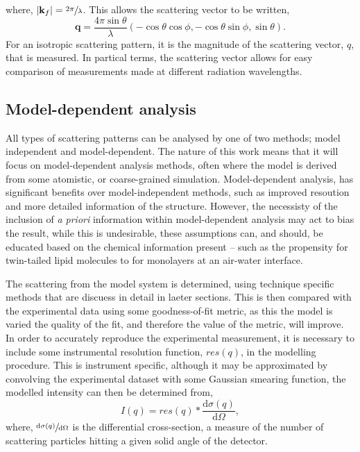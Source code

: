 %
where, $|\mathbf{k}_f| = \sfrac{2\pi}{\lambda}$. This allows the scattering vector to be written,
%
\begin{equation}
	\mathbf{q} = \frac{4\pi\sin{\theta}}{\lambda}(-\cos{\theta}\cos{\phi}, -\cos{\theta}\sin{\phi},\sin{\theta}).
\end{equation}
%
For an isotropic scattering pattern, it is the magnitude of the scattering vector, $q$, that is measured. In partical terms, the scattering vector allows for easy comparison of measurements made at different radiation wavelengths.

\subsection{Model-dependent analysis}

All types of scattering patterns can be analysed by one of two methods; model independent and model-dependent. The nature of this work means that it will focus on model-dependent analysis methods, often where the model is derived from some atomistic, or coarse-grained simulation. Model-dependent analysis, has significant benefits over model-independent methods, such as improved resoution and more detailed information of the structure. However, the necessisty of the inclusion of \emph{a priori} information within model-dependent analysis may act to bias the result, while this is undesirable, these assumptions can, and should, be educated based on the chemical information present -- such as the propensity for twin-tailed lipid molecules to for monolayers at an air-water interface.\cite{McCluskey2018}

The scattering from the model system is determined, using technique specific methods that are discuess in detail in laeter sections. This is then compared with the experimental data using some goodness-of-fit metric, as this the model is varied the quality of the fit, and therefore the value of the metric, will improve. In order to accurately reproduce the experimental measurement, it is necessary to include some instrumental resolution function, $res(q)$, in the modelling procedure. This is instrument specific, although it may be approximated by convolving the experimental dataset with some Gaussian smearing function, the modelled intensity can then be determined from,
%
\begin{equation}
	I(q) = res(q) * \frac{\text{d}\sigma(q)}{\text{d}\Omega},
\end{equation}
%
where, $\sfrac{\text{d}\sigma(q)}{\text{d}\Omega}$ is the differential cross-section, a measure of the number of scattering particles hitting a given solid angle of the detector.


